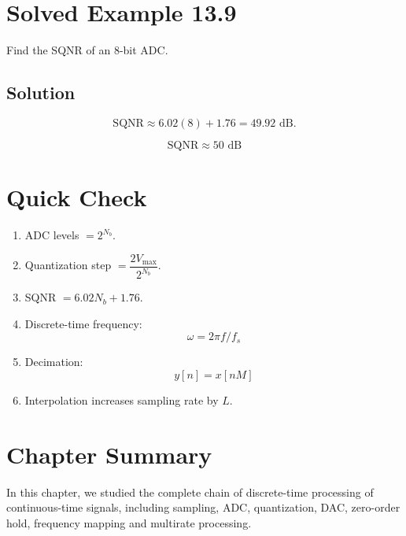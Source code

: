 
\section{Solved Example 13.9}

Find the SQNR of an 8-bit ADC.


\subsection{Solution}

\[
\text{SQNR}\approx
6.02(8)+1.76
=
49.92\text{ dB}.
\]

\[
\boxed{
\text{SQNR}\approx50\text{ dB}
}
\]


\section{Quick Check}

\begin{enumerate}
\item ADC levels \(=\boxed{2^{N_b}}\).
\item Quantization step \(=\boxed{\dfrac{2V_{\max}}{2^{N_b}}}\).
\item SQNR \(=\boxed{6.02N_b+1.76}\).
\item Discrete-time frequency:
\[
\boxed{\omega=2\pi f/f_s}
\]
\item Decimation:
\[
\boxed{y[n]=x[nM]}
\]
\item Interpolation increases sampling rate by \(\boxed{L}\).
\end{enumerate}


\section{Chapter Summary}

In this chapter, we studied the complete chain of discrete-time processing of
continuous-time signals, including sampling, ADC, quantization, DAC, zero-order
hold, frequency mapping and multirate processing.

